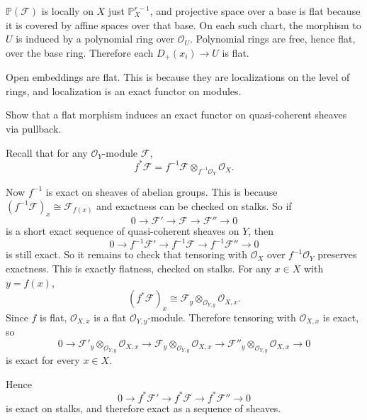 \documentclass[12pt]{article}
\begin{document}
\begin{solution}
    $\mathbb{P}(\mathcal{F})$ is locally on $X$ just $\mathbb{P}^{r-1}_X$, and projective space over a base is flat because it is covered by affine spaces over that base. On each such chart, the morphism to $U$ is induced by a polynomial ring over $\mathcal{O}_U$. Polynomial rings are free, hence flat, over the base ring. Therefore each $D_+(x_i) \to U$ is flat.
\end{solution}

\begin{example}
    Open embeddings are flat. This is because they are localizations on the level of rings, and localization is an exact functor on modules.
\end{example}

\begin{exercise}
    Show that a flat morphism induces an exact functor on quasi-coherent sheaves via pullback.
\end{exercise}

\begin{solution}
    Recall that for any $\mathcal O_Y$-module $\mathcal F$,
    \[
        f^*\mathcal F
        =
        f^{-1}\mathcal F \otimes_{f^{-1}\mathcal O_Y} \mathcal O_X .
    \]

    Now $f^{-1}$ is exact on sheaves of abelian groups. This is because $(f^{-1}\mathcal F)_x \cong \mathcal F_{f(x)}$ and exactness can be checked on stalks. So if
    \[
        0 \to \mathcal F' \to \mathcal F \to \mathcal F'' \to 0
    \]
    is a short exact sequence of quasi-coherent sheaves on $Y$, then
    \[
        0 \to f^{-1}\mathcal F' \to f^{-1}\mathcal F \to f^{-1}\mathcal F'' \to 0
    \]
    is still exact. So it remains to check that tensoring with $\mathcal O_X$ over $f^{-1}\mathcal O_Y$ preserves exactness. This is exactly flatness, checked on stalks. For any $x \in X$ with $y=f(x)$,
    \[
        (f^*\mathcal F)_x
        \cong
        \mathcal F_y \otimes_{\mathcal O_{Y,y}} \mathcal O_{X,x}.
    \]
    Since $f$ is flat, $\mathcal O_{X,x}$ is a flat $\mathcal O_{Y,y}$-module. Therefore tensoring with $\mathcal O_{X,x}$ is exact, so
    \[
        0 \to \mathcal F'_y\otimes_{\mathcal O_{Y,y}}\mathcal O_{X,x}
        \to \mathcal F_y\otimes_{\mathcal O_{Y,y}}\mathcal O_{X,x}
        \to \mathcal F''_y\otimes_{\mathcal O_{Y,y}}\mathcal O_{X,x}
        \to 0
    \]
    is exact for every $x\in X$.

    Hence
    \[
        0\to f^*\mathcal F' \to f^*\mathcal F \to f^*\mathcal F'' \to 0
    \]
    is exact on stalks, and therefore exact as a sequence of sheaves.
\end{solution}
\end{document}
